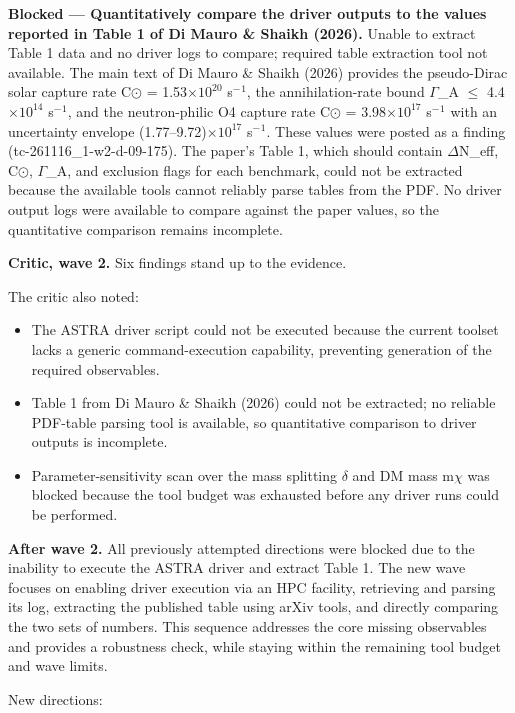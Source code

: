 \documentclass[11pt,a4paper]{article}
\begin{document}
\textbf{Blocked --- Quantitatively compare the driver outputs to the values reported in Table 1 of Di Mauro \& Shaikh (2026).} Unable to extract Table 1 data and no driver logs to compare; required table extraction tool not available. The main text of Di Mauro \& Shaikh (2026) provides the pseudo-Dirac solar capture rate C$\odot$ = 1.53$\times$$10^{20}$ s$^-$$^1$, the annihilation-rate bound $\Gamma$\_A $\leq$ 4.4$\times$$10^{14}$ s$^-$$^1$, and the neutron-philic O4 capture rate C$\odot$ = 3.98$\times$$10^{17}$ s$^-$$^1$ with an uncertainty envelope (1.77--9.72)$\times$$10^{17}$ s$^-$$^1$. These values were posted as a finding (tc-261116\_1-w2-d-09-175). The paper's Table 1, which should contain $\Delta$N\_eff, C$\odot$, $\Gamma$\_A, and exclusion flags for each benchmark, could not be extracted because the available tools cannot reliably parse tables from the PDF. No driver output logs were available to compare against the paper values, so the quantitative comparison remains incomplete.

\textbf{Critic, wave 2.} Six findings stand up to the evidence.

The critic also noted:

\begin{itemize}
  \item The ASTRA driver script could not be executed because the current toolset lacks a generic command-execution capability, preventing generation of the required observables.
  \item Table 1 from Di Mauro \& Shaikh (2026) could not be extracted; no reliable PDF-table parsing tool is available, so quantitative comparison to driver outputs is incomplete.
  \item Parameter-sensitivity scan over the mass splitting $\delta$ and DM mass m$\chi$ was blocked because the tool budget was exhausted before any driver runs could be performed.
\end{itemize}
\textbf{After wave 2.} All previously attempted directions were blocked due to the inability to execute the ASTRA driver and extract Table 1. The new wave focuses on enabling driver execution via an HPC facility, retrieving and parsing its log, extracting the published table using arXiv tools, and directly comparing the two sets of numbers. This sequence addresses the core missing observables and provides a robustness check, while staying within the remaining tool budget and wave limits.

New directions:
\end{document}
